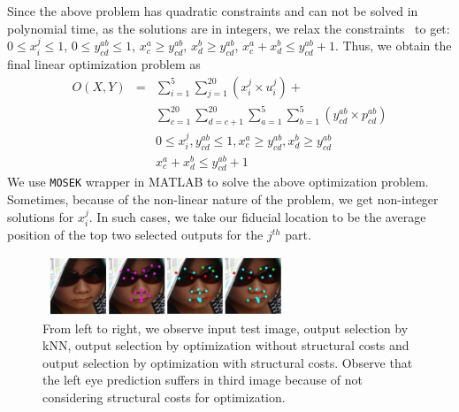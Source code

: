 Since the above problem has quadratic constraints and can not be solved in polynomial time, as the solutions are in integers, we
relax the constraints~\cite{DBLP:journals/corr/ChariLLS14} to get:
$0 \leq x_i^j \leq 1$, $0 \leq y_{cd}^{ab} \leq 1$, $x_c^a \geq y_{cd}^{ab}$, $x_d^b \geq
y_{cd}^{ab}$, $x_c^a + x_d^b \le y_{cd}^{ab} + 1$. Thus, we obtain the final linear
optimization problem as 
\begin{eqnarray}
O(X,Y) & = & \sum_{i=1}^{5} \sum_{j=1}^{20} (x_i^j \times u_i^j) + \nonumber \\
        & & \sum_{c=1}^{20} \sum_{d=c+1}^{20} \sum_{a=1}^{5} \sum_{b=1}^{5} (y_{cd}^{ab} \times p_{cd}^{ab}) \nonumber \\
        & & 0 \leq x_i^j, y^{ab}_{cd} \leq 1, x_c^a \geq y_{cd}^{ab}, x_d^b \geq y_{cd}^{ab} \nonumber \\
        & & x_c^a + x_d^b \le y_{cd}^{ab} + 1 
\end{eqnarray}
We use {\tt MOSEK} wrapper in MATLAB to solve the above optimization problem. Sometimes, because of
the non-linear nature of the problem, we get non-integer solutions for $x^j_i$. In such cases, we
take our fiducial location to be the average position of the top two selected outputs for the
$j^{th}$ part.

\begin{figure}
\centering
\includegraphics[width=2.9in,height=0.7in]{fid/figures/with_without_pairwise.png}
\caption{From left to right, we observe input test image, output selection by kNN, output selection by optimization without structural costs and output selection by optimization with structural costs. Observe that the left eye prediction suffers in third image because of not considering structural costs for optimization.}
\label{fig:with_without_structural_costs}
\end{figure}

